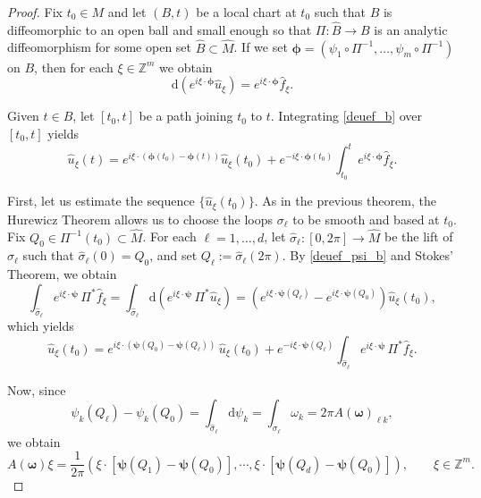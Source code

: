 \documentclass[11pt,reqno]{amsart}
\numberwithin{equation}{section}
\begin{document}
\begin{proof}
		Fix \(t_0\in M\) and let \((B,t)\) be a local chart at \(t_0\) such that \(B\) is diffeomorphic to an open ball and small enough so that
		\(\Pi:\hat B\to B\) is an analytic diffeomorphism for some open set \(\hat B\subset \hat M\).
		If we set \(\boldsymbol{\phi}=(\psi_1\circ\Pi^{-1},\dots,\psi_m\circ\Pi^{-1})\) on \(B\), then for each \(\xi\in\mathbb{Z}^m\) we obtain
		\begin{equation}\label{deuef_b}
			\mathrm{d}(e^{i\xi\cdot\boldsymbol{\phi}}\widehat{u}_\xi) = e^{i\xi\cdot\boldsymbol{\phi}}\widehat{f}_\xi.
		\end{equation}
		
		Given \(t\in B\), let \([t_0,t]\) be a path joining \(t_0\) to \(t\).
		Integrating \eqref{deuef_b} over \([t_0,t]\) yields
		\begin{equation}\label{uxit0_b}
			\widehat{u}_\xi(t)
			= e^{i\xi\cdot (\boldsymbol{\phi}(t_0) - \boldsymbol{\phi}(t))}\widehat{u}_\xi(t_0) + e^{-i\xi\cdot\boldsymbol{\phi} (t_0)}\int_{t_0}^t e^{i\xi\cdot\boldsymbol{\phi}}\widehat{f}_\xi.
		\end{equation}
		
		First, let us estimate the sequence \(\{\widehat{u}_\xi(t_0)\}\).
		As in the previous theorem, the Hurewicz Theorem allows us to choose the loops \(\sigma_\ell\) to be smooth and based at \(t_0\).
		Fix \(Q_0\in \Pi^{-1}(t_0)\subset \hat M\).
		For each \(\ell=1,\dots,d\), let \(\hat\sigma_\ell:[0,2\pi]\to\hat M\) be the lift of \(\sigma_\ell\) such that
		\(\hat\sigma_\ell(0)=Q_0\), and set \(Q_\ell:=\hat\sigma_\ell(2\pi)\).
		By \eqref{deuef_psi_b} and Stokes' Theorem, we obtain
		\begin{equation*}
			\int_{\hat\sigma_\ell}e^{i\xi\cdot\boldsymbol{\psi}}\,\Pi^*\widehat{f}_\xi
			= \int_{\hat\sigma_\ell} \mathrm{d}\!\left(e^{i\xi\cdot\boldsymbol{\psi}} \,\Pi^*\widehat{u}_\xi\right)
			= \left(e^{i\xi\cdot\boldsymbol{\psi} (Q_\ell)}-e^{i\xi\cdot\boldsymbol{ \psi}(Q_0)}\right)\widehat{u}_\xi(t_0),
		\end{equation*}
		which yields
		\begin{equation*}
			\widehat{u}_\xi(t_0)
			= e^{i\xi\cdot (\boldsymbol{\psi}(Q_0) - \boldsymbol{\psi}(Q_\ell))} \,\widehat{u}_\xi(t_0) + e^{-i\xi\cdot\boldsymbol{\psi}(Q_\ell)}
			\int_{\hat\sigma_\ell}e^{i\xi\cdot\boldsymbol{\psi}}\,\Pi^*\widehat{f}_\xi.
		\end{equation*}
		
		Now, since
		\[
		\psi_k(Q_\ell)-\psi_k(Q_0) = \int_{\hat\sigma_\ell}\mathrm{d}\psi_k
		= \int_{\sigma_\ell}\omega_k = 2\pi A(\boldsymbol{\omega})_{\ell k},
		\]
		we obtain
		\[
		A(\boldsymbol{\omega})\xi
		= \dfrac{1}{2\pi}\left( \xi\cdot [\boldsymbol{\psi}(Q_1) - \boldsymbol{\psi}(Q_0)],\cdots, \xi\cdot  [\boldsymbol{\psi}(Q_d) - \boldsymbol{\psi}(Q_0)] \right),  \qquad \xi\in\mathbb{Z}^m.
		\]
		

\end{proof}
\end{document}

